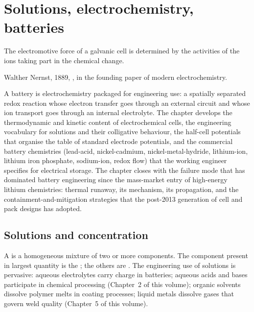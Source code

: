 \chapter{Solutions, electrochemistry, batteries}
\label{vol05:ch03}

\epigraph{The electromotive force of a galvanic cell is determined by
the activities of the ions taking part in the chemical change.}{Walther
Nernst, 1889, \cite[pp.~129--181]{hist:nernst1889}, in the founding
paper of modern electrochemistry.}


\noindent
A battery is electrochemistry packaged for engineering use: a spatially
separated redox reaction whose electron transfer goes through an
external circuit and whose ion transport goes through an internal
electrolyte. The chapter develops the thermodynamic and kinetic content
of electrochemical cells, the engineering vocabulary for solutions and
their colligative behaviour, the half-cell potentials that organise the
table of standard electrode potentials, and the commercial battery
chemistries (lead-acid, nickel-cadmium, nickel-metal-hydride, lithium-ion,
lithium iron phosphate, sodium-ion, redox flow) that the working
engineer specifies for electrical storage. The chapter closes with the
failure mode that has dominated battery engineering since the
mass-market entry of high-energy lithium chemistries: thermal runaway,
its mechanism, its propagation, and the containment-and-mitigation
strategies that the post-2013 generation of cell and pack designs has
adopted.

\section{Solutions and concentration}

A  is a homogeneous mixture of two or more components.
The component present in largest quantity is the ; the
others are . The engineering use of solutions is
pervasive: aqueous electrolytes carry charge in batteries; aqueous
acids and bases participate in chemical processing (Chapter~2 of this
volume); organic solvents dissolve polymer melts in coating processes;
liquid metals dissolve gases that govern weld quality (Chapter~5 of
this volume).

